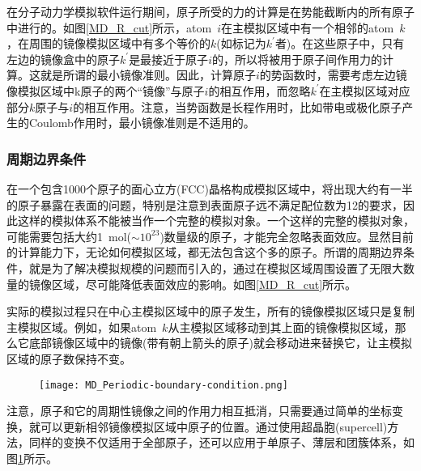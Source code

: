 在分子动力学模拟软件运行期间，原子所受的力的计算是在势能截断内的所有原子中进行的。如图\ref{MD_R_cut}所示，\textrm{atom}~$i$在主模拟区域中有一个相邻的\textrm{atom}~$k$，在周围的镜像模拟区域中有多个等价的$k$(如标记为$k^{\prime}$者)。在这些原子中，只有左边的镜像盒中的原子$k^{\prime}$是最接近于原子$i$的，所以将被用于原子间作用力的计算。这就是所谓的最小镜像准则。因此，计算原子$i$的势函数时，需要考虑左边镜像模拟区域中k原子的两个“镜像”与原子$i$的相互作用，而忽略$k^{\prime}$在主模拟区域对应部分$k$原子与$i$的相互作用。注意，当势函数是长程作用时，比如带电或极化原子产生的\textrm{Coulomb}作用时，最小镜像准则是不适用的。
\subsubsection{周期边界条件}
在一个包含1000个原子的面心立方\textrm{(FCC)}晶格构成模拟区域中，将出现大约有一半的原子暴露在表面的问题，特别是注意到表面原子远不满足配位数为12的要求，因此这样的模拟体系不能被当作一个完整的模拟对象。一个这样的完整的模拟对象，可能需要包括大约1~\textrm{mol}($\sim10^{23}$)数量级的原子，才能完全忽略表面效应。显然目前的计算能力下，无论如何模拟区域，都无法包含这个多的原子。所谓的周期边界条件\cite{PZ13-297_1912}，就是为了解决模拟规模的问题而引入的，通过在模拟区域周围设置了无限大数量的镜像区域，尽可能降低表面效应的影响。如图\ref{MD_R_cut}所示。

实际的模拟过程只在中心主模拟区域中的原子发生，所有的镜像模拟区域只是复制主模拟区域。例如，如果\textrm{atom}~$k$从主模拟区域移动到其上面的镜像模拟区域，那么它底部镜像区域中的镜像(带有朝上箭头的原子)就会移动进来替换它，让主模拟区域的原子数保持不变。
\begin{figure}[h!]
\centering
\vspace*{-0.1in}
\texttt{[image: MD\_Periodic-boundary-condition.png]}
\caption{\fontsize{7.2pt}{4.2pt}\selectfont{周期边界条件下模拟材料计算的各种模型(原子/分子，表面/界面，体相)选取方式示意图.}}%
\label{MD_Periodic}
\end{figure}
注意，原子和它的周期性镜像之间的作用力相互抵消，只需要通过简单的坐标变换，就可以更新相邻镜像模拟区域中原子的位置。通过使用超晶胞\textrm{(supercell)}方法，同样的变换不仅适用于全部原子，还可以应用于单原子、薄层和团簇体系，如图\ref{MD_Periodic}所示。

